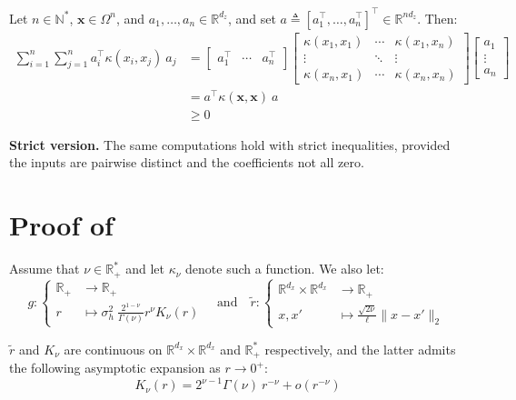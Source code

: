 Let $n\in\mathbb{N}^*$, $\mathbf{x}\in\Omega^n$, and $a_1,\dots,a_n\in\mathbb{R}^{d_z}$, and set $a\triangleq[a_1^\top,\dots,a_n^\top]^\top\in\mathbb{R}^{nd_z}$. Then:
\begin{equation}
	\begin{aligned}
	\sum_{i=1}^n\sum_{j=1}^na_i^\top \kappa(x_i,x_j)\:a_j&=\begin{bmatrix}a_1^\top&\cdots&a_n^\top\end{bmatrix}\begin{bmatrix}\kappa(x_1,x_1)&\cdots&\kappa(x_1,x_n)\\\vdots&\ddots&\vdots\\\kappa(x_n,x_1)&\cdots&\kappa(x_n,x_n)\end{bmatrix}\begin{bmatrix}a_1\\\vdots\\a_n\end{bmatrix}\\
	&=a^\top \kappa(\mathbf{x},\mathbf{x})\:a\\
	&\geq0
	\end{aligned}
\end{equation}

\textbf{Strict version.} The same computations hold with strict inequalities, provided the inputs are pairwise distinct and the coefficients not all zero.

\section[Proof of Proposition 3.3]{Proof of }\label{sec:proof_Matérn}

Assume that $\nu\in\mathbb{R}_+^*$ and let $\kappa_\nu$ denote such a function. We also let:
\begin{equation}
	g:\left\{\begin{aligned}
	\mathbb{R}_+&\to\mathbb{R}_+\\
	r&\mapsto\sigma_h^2\:\frac{2^{1-\nu}}{\Gamma(\nu)}r^\nu K_\nu(r)
	\end{aligned}\right.
	\quad\text{and}\quad
	\tilde{r}:\left\{\begin{aligned}
	\mathbb{R}^{d_x}\times\mathbb{R}^{d_x}&\to\mathbb{R}_+\\
	x,x'&\mapsto\frac{\sqrt{2\nu}}{\ell}\|x-x'\|_2
	\end{aligned}\right.
\end{equation}

$\tilde{r}$ and $K_\nu$ are continuous on $\mathbb{R}^{d_x}\times\mathbb{R}^{d_x}$ and $\mathbb{R}_+^*$ respectively, and the latter admits the following asymptotic expansion as $r\to0^+$:
\begin{equation}
	K_\nu(r)=2^{\nu-1}\Gamma(\nu)\:r^{-\nu}+o\left(r^{-\nu}\right)
\end{equation}

